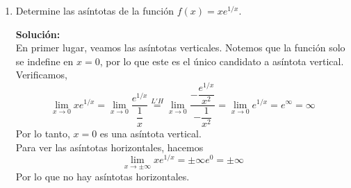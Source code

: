 \documentclass[12pt]{article}
\newenvironment{solucion}
{\begin{mdframed}[backgroundcolor=black!10]
		{\bf Solución:}\\
	}
	{
	\end{mdframed}
}
\newenvironment{preguntas}
{\begin{enumerate}\itemsep12pt
	}
	{
	\end{enumerate}
}
\newcommand{\ra}{\rightarrow}
\newcommand{\lh}{\stackrel{L'H}{=}}
\begin{document}
\begin{preguntas}
\begin{solucion}
Para demostrar que la ecuación tiene alguna solución, definimos la función auxiliar
$$f(x) = \sin x - 2x + 1$$
Al evaluar, podemos ver que
$$f(0) = 1, \qquad f(2) = \sin 2 - 3 < 0$$
Notemos que $f$ es una función continua en todos los reales. Luego, por TVI, 
$$\exists c \in (0,2) \text{ tal que } f(c) = 0$$
Para demostrar que la ecuación no tiene más de una solución, lo haremos por contradicción. Digamos que la ecuación tiene 2 soluciones, $x_1$ y $x_2$ con $x_1 < x_2$.\\

Luego, $f(x_1) = 0$ y $f(x_2) = 0$. Notemos que $f$ es derivable en todos los reales. Entonces, por TVM
$$\exists c \in (x_1, x_2) \text{ tal que } f'(c) = \dfrac{f(x_2) - f(x_1)}{x_2-x_1} = 0$$
Sin embargo, notemos que
$$f'(x) = \cos x - 2 = 0 \ra \cos x = 2$$
Lo que no se cumple para ningún $x$, por lo que no existe ningún $c$ donde $f'(c) = 0$.\\

Esto es una contradicción con nuestra suposición anterior, por lo que la ecuación no puede tener dos soluciones.\\

En conclusión, la ecuación tiene solución única. 
$$\blacksquare$$
\end{solucion}
\item Determine las asíntotas de la función $f(x) = xe^{1/x}$.
\begin{solucion}
En primer lugar, veamos las asíntotas verticales. Notemos que la función solo se indefine en $x=0$, por lo que este es el único candidato a asíntota vertical.\\

Verificamos,
$$\lim\limits_{x \ra 0} xe^{1/x} = 
\lim\limits_{x \ra 0} \dfrac{e^{1/x}}{\dfrac{1}{x}} \lh
\lim\limits_{x \ra 0} \dfrac{-\dfrac{e^{1/x}}{x^2}}{-\dfrac{1}{x^2}} =
\lim\limits_{x \ra 0} e^{1/x} =
e^{\infty} = \infty
$$
Por lo tanto, $x = 0$ es una asíntota vertical.\\

Para ver las asíntotas horizontales, hacemos
$$\lim\limits_{x \ra \pm \infty} xe^{1/x} = \pm \infty e^0 = \pm \infty$$
Por lo que no hay asíntotas horizontales.\\


\end{solucion}
\end{preguntas}
\end{document}

